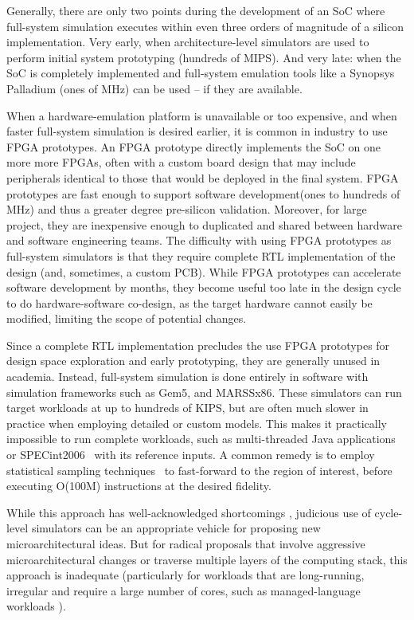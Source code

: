 Generally, there are only two points during the development of an SoC where
full-system simulation executes within even three orders of magnitude of a
silicon implementation. Very early, when architecture-level simulators are used
to perform initial system prototyping (hundreds of MIPS). And very late: when
the SoC is completely implemented and full-system emulation tools like a
Synopsys Palladium\cite{palladium} (ones of MHz) can be used -- if they are
available.

When a hardware-emulation platform is unavailable or too expensive, and when
faster full-system simulation is desired earlier, it is common in industry to
use FPGA prototypes. An FPGA prototype directly implements the SoC on
one more more FPGAs, often with a custom board design that may include
peripherals identical to those that would be deployed in the final system. FPGA
prototypes are fast enough to support software development(ones to hundreds of
MHz) and thus a greater degree pre-silicon validation. Moreover, for large
project, they are inexpensive enough to duplicated and shared between hardware
and software engineering teams.  The difficulty with using FPGA prototypes as
full-system simulators is that they require complete RTL implementation of the
design (and, sometimes, a custom PCB). While FPGA prototypes can accelerate
software development by months, they become useful too late in the design cycle
to do hardware-software co-design, as the target hardware cannot easily be
modified, limiting the scope of potential changes.

Since a complete RTL implementation precludes the use FPGA prototypes for
design space exploration and early prototyping, they are generally unused in
academia. Instead, full-system simulation is done entirely in software with
simulation frameworks such as Gem5\cite{gem5}, and MARSSx86\cite{marssx86}.
These simulators can run target workloads at up to hundreds of KIPS, but are
often much slower in practice when employing detailed or custom models. This
makes it practically impossible to run complete workloads, such as
multi-threaded Java applications or SPECint2006~\cite{spec} with its reference
inputs. A common remedy is to employ statistical sampling
techniques~\cite{smarts} to fast-forward to the region of interest, before
executing O(100M) instructions at the desired fidelity.

While this approach has well-acknowledged shortcomings \cite{gem5error},
judicious use of cycle-level simulators can be an appropriate vehicle for
proposing new microarchitectural ideas. But for radical proposals that involve
aggressive microarchitectural changes or traverse multiple layers of the
computing stack, this approach is inadequate (particularly for workloads that
are long-running, irregular and require a large number of cores, such as
managed-language workloads \cite{MicroSimPanel}).

